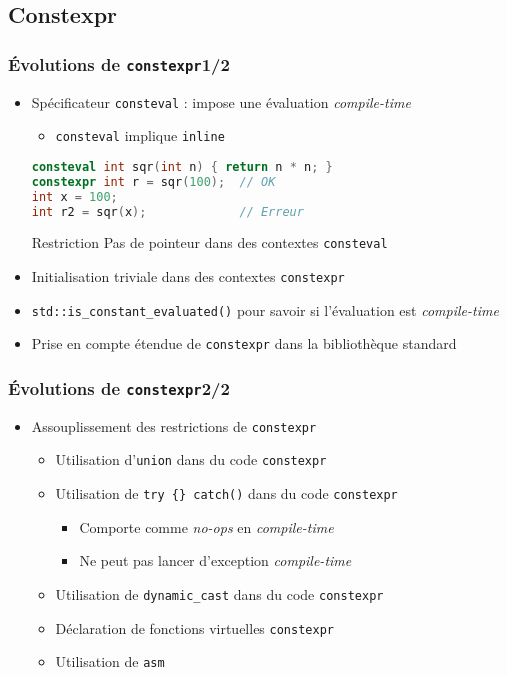 \documentclass[C++.tex]{subfiles}
\begin{document}
\subsection*{Constexpr}
\begin{frame}[fragile]
	\frametitle{Évolutions de \lstinline|constexpr|\titlehfill{}1/2}
	\begin{itemize}
		\item Spécificateur \lstinline|consteval| : impose une évaluation \textit{compile-time}
		\begin{itemize}
			\item \lstinline|consteval| implique \lstinline|inline|
		\end{itemize}

		\begin{lstlisting}[language=C++]
consteval int sqr(int n) { return n * n; }
constexpr int r = sqr(100);  // OK
int x = 100;
int r2 = sqr(x);             // Erreur\end{lstlisting}

		\begin{alertblock}{Restriction}
			Pas de pointeur dans des contextes \lstinline|consteval|
		\end{alertblock}

		\item Initialisation triviale dans des contextes \lstinline|constexpr|
		\item \lstinline|std::is_constant_evaluated()| pour savoir si l'évaluation est \textit{compile-time}
		\item Prise en compte étendue de \lstinline|constexpr| dans la bibliothèque standard
	\end{itemize}
\end{frame}

\begin{frame}[fragile]
	\frametitle{Évolutions de \lstinline|constexpr|\titlehfill{}2/2}
	\begin{itemize}
		\item Assouplissement des restrictions de \lstinline|constexpr|
		\begin{itemize}
			\item Utilisation d'\lstinline|union| dans du code \lstinline|constexpr|
			\item Utilisation de \lstinline|try {} catch()| dans du code \lstinline|constexpr|
			\begin{itemize}
				\item Comporte comme \textit{no-ops} en \textit{compile-time}
				\item Ne peut pas lancer d'exception \textit{compile-time}
			\end{itemize}
			\item Utilisation de \lstinline|dynamic_cast| dans du code \lstinline|constexpr|
			\item Déclaration de fonctions virtuelles \lstinline|constexpr|
			\item Utilisation de \lstinline|asm|
		\end{itemize}
	\end{itemize}
\end{frame}
\end{document}
